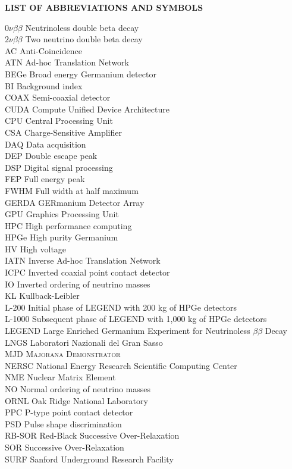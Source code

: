 {}

\begin{center}
{\normalfont \textbf{LIST OF ABBREVIATIONS AND SYMBOLS}}
\end{center}

\newcommand{\Ab}[2]{\noindent  #1 \> #2 \\}
\newcommand{\Abi}[2]{\noindent #1 \hspace{1.5cm} \= #2 \\}

\begin{tabbing}
\Abi{$0\nu\beta\beta$}{Neutrinoless double beta decay}
\Ab{$2\nu\beta\beta$}{Two neutrino double beta decay}
\Ab{AC}{Anti-Coincidence}
\Ab{ATN}{Ad-hoc Translation Network}
\Ab{BEGe}{Broad energy Germanium detector}
\Ab{BI}{Background index}
\Ab{COAX}{Semi-coaxial detector}
\Ab{CUDA} {Compute Unified Device Architecture}
\Ab{CPU}{Central Processing Unit}
\Ab{CSA} {Charge-Sensitive Amplifier}
\Ab{DAQ}{Data acquisition}
\Ab{DEP}{Double escape peak}
\Ab{DSP}{Digital signal processing}
\Ab{FEP}{Full energy peak}
\Ab{FWHM}{Full width at half maximum}
\Ab{GERDA}{GERmanium Detector Array}
\Ab{GPU}{Graphics Processing Unit}
\Ab{HPC}{High performance computing}
\Ab{HPGe}{High purity Germanium}
\Ab{HV}{High voltage}
\Ab{IATN}{Inverse Ad-hoc Translation Network}
\Ab{ICPC}{Inverted coaxial point contact detector}
\Ab{IO}{Inverted ordering of neutrino masses}
\Ab{KL}{Kullback-Leibler} 
\Ab{L-200}{Initial phase of LEGEND with 200 kg of HPGe detectors}
\Ab{L-1000}{Subsequent phase of LEGEND with 1,000 kg of HPGe detectors}
\Ab{LEGEND}{Large Enriched Germanium Experiment for Neutrinoless $\beta\beta$ Decay}
\Ab{LNGS}{Laboratori Nazionali del Gran Sasso}
\Ab{MJD}{\textsc{Majorana Demonstrator}}
\Ab{NERSC}{National Energy Research Scientific Computing Center}
\Ab{NME}{Nuclear Matrix Element}
\Ab{NO}{Normal ordering of neutrino masses}
\Ab{ORNL}{Oak Ridge National Laboratory}
\Ab{PPC}{P-type point contact detector}
\Ab{PSD}{Pulse shape discrimination}
\Ab{RB-SOR} {Red-Black Successive Over-Relaxation}
\Ab{SOR} {Successive Over-Relaxation}
\Ab{SURF}{Sanford Underground Research Facility}
\end{tabbing}

\clearpage

